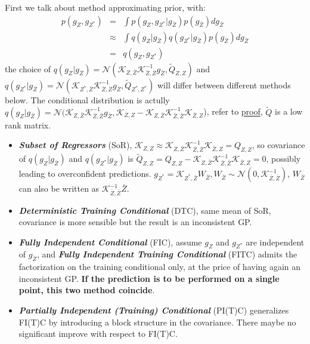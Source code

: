 \documentclass[10pt]{elegantbook}
\newcommand{\mydefination}[1]{\textbf{\textit{\textcolor{structurecolor}{#1}}}}
\begin{document}
First we talk about method approximating prior, with:
\begin{equation}
    \begin{array}{rll}
        p(g_{Z},g_{Z^{*}}) &=& \int p(g_{Z},g_{Z^{*}}|g_{\bar Z})p(g_{\bar Z})d g_{\bar Z} \\ 
        &\approx&\int q(g_{Z}|g_{\bar Z})q(g_{Z^{*}}|g_{\bar Z})p(g_{\bar Z})d g_{\bar Z} \\
        &=& q(g_{Z},g_{Z^{*}})
    \end{array}
\end{equation}
the choice of $q(g_{Z}|g_{\bar Z}) = \mathcal N(\mathscr{K}_{Z, \bar Z}\mathscr{K}_{\bar Z, \bar Z}^{-1}g_{\bar Z}, \tilde Q_{Z, Z})$ 
and $q(g_{Z^{*}}|g_{\bar Z}) = \mathcal N(\mathscr{K}_{Z^*, \bar Z}\mathscr{K}_{\bar Z, \bar Z}^{-1}g_{\bar Z}, \tilde Q_{Z^*, Z^*})$ 
will differ between different methods below. The conditional distribution is actully $q(g_{Z}|g_{\bar Z}) = \mathcal N(\mathscr{K}_{Z,
 \bar Z}\mathscr{K}_{\bar Z, \bar Z}^{-1}g_{\bar Z}, \mathscr{K}_{Z, Z} - \mathscr{K}_{Z, \bar Z}
 \mathscr{K}_{\bar Z, \bar Z}^{-1}\mathscr{K}_{\bar Z, Z}$), 
refer to \href{https://statproofbook.github.io/P/mvn-cond.html}{proof}, $\tilde Q$ is a low rank matrix.
\begin{itemize}
    \item \mydefination{Subset of Regressors} (SoR), $\mathscr{K}_{Z, Z} \approx \mathscr{K}_{Z, \bar Z}\mathscr{K}_{\bar Z, \bar Z}^{-1}\mathscr{K}_{\bar Z, Z} = Q_{Z, Z}$,
so covariance of $q(g_{Z}|g_{\bar Z})$ and $q(g_{Z^{*}}|g_{\bar Z})$ is $\tilde Q_{Z, Z} = Q_{Z, Z} - \mathscr{K}_{Z, \bar Z}\mathscr{K}_{\bar Z, \bar Z}^{-1}\mathscr{K}_{\bar Z, Z}= 0$, 
possibly leading to overconfident predictions. $g_{Z^{*}} = \mathscr{K}_{Z^*, \bar Z} W_{\bar Z}, W_{\bar Z} \sim \mathcal N(0, \mathscr{K}_{\bar Z, \bar Z}^{-1})$, 
$W_{\bar Z}$ can also be written as $\mathscr{K}_{\bar Z, \bar Z}^{-1} \bar Z$.
    \item \mydefination{Deterministic Training Conditional} (DTC), same mean of SoR, covariance is more sensible but the result 
is an inconsistent GP.
    \item \mydefination{Fully Independent Conditional} (FIC), assume $g_{Z}$ and $g_{Z^{*}}$ are independent of $g_{\bar Z}$,
and \mydefination{Fully Independent Training Conditional} (FITC) admits the factorization on the training conditional only, at the price of having again an inconsistent
GP. \textbf{If the prediction is to be performed on a single point, this two method coincide}.
    \item \mydefination{Partially Independent (Training) Conditional} (PI(T)C) generalizes FI(T)C by
introducing a block structure in the covariance. There maybe no significant improve with respect to FI(T)C.
\end{itemize}
\end{document}
